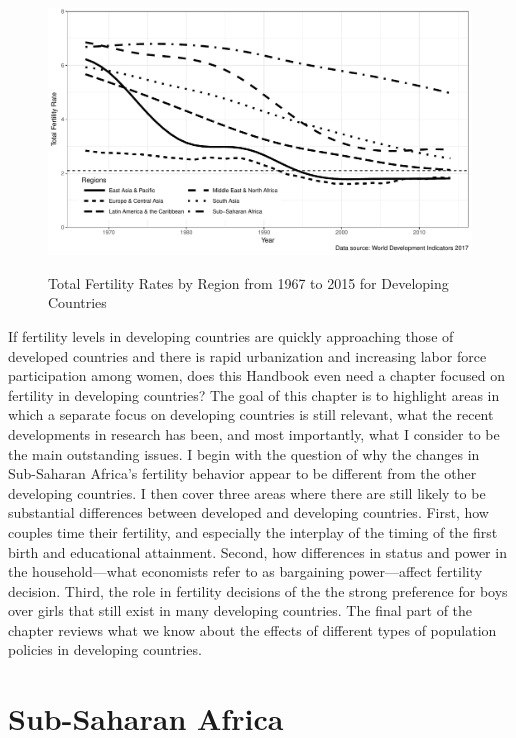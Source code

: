 \documentclass[letterpaper,12pt]{article}
\begin{document}
\begin{figure}[hp]
    \centering
    \caption{Total Fertility Rates by Region from 1967 to 2015 for Developing Countries}
    \includegraphics[width=0.95\linewidth]{../figures/totalFertilityRatesBW.pdf}
    \label{fig:TFR}
\end{figure}

If fertility levels in developing countries are quickly approaching 
those of developed countries and there is rapid urbanization and increasing labor
force participation among women, does this Handbook even need a chapter
focused on fertility in developing countries? 
The goal of this chapter is to highlight areas in which a separate focus 
on developing countries is still relevant, what the recent developments 
in research has been, and most importantly, what I consider to be the 
main outstanding issues.
I begin with the question of why the changes in Sub-Saharan Africa's 
fertility behavior appear to be different from the other developing countries. 
I then cover three areas where there are still likely to be substantial
differences between developed and developing countries.
First, how couples time their fertility, and especially the interplay of
the timing of the first birth and educational attainment.
Second, how differences in status and power in the household---what economists 
refer to as bargaining power---affect fertility decision.
Third, the role in fertility decisions of the the strong preference for boys 
over girls that still exist in many developing countries. 
The final part of the chapter reviews what we know about the effects
of different types of population policies in developing countries.


\section{Sub-Saharan Africa}
\end{document}
